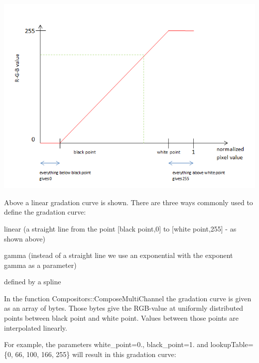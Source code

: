 \begin{DoxyImage}
\includegraphics[width=\textwidth,height=\textheight/2,keepaspectratio=true]{gradationcurve_1.PNG}
\end{DoxyImage}
 Above a linear gradation curve is shown. There are three ways commonly used to define the gradation curve\+:
\begin{DoxyItemize}
\item linear (a straight line from the point \mbox{[}black point,0\mbox{]} to \mbox{[}white point,255\mbox{]} -\/ as shown above)
\item gamma (instead of a straight line we use an exponential with the exponent gamma as a parameter)
\item defined by a spline
\end{DoxyItemize}

In the function Compositors\+::\+Compose\+Multi\+Channel the gradation curve is given as an array of bytes. Those bytes give the R\+G\+B-\/value at uniformly distributed points between black point and white point. Values between those points are interpolated linearly.

For example, the parameters white\+\_\+point=0., black\+\_\+point=1. and lookup\+Table=\{0, 66, 100, 166, 255\} will result in this gradation curve\+:


